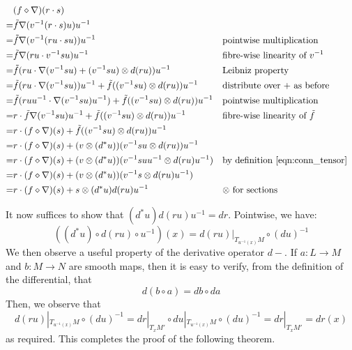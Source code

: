 \begin{align*}
   & (f \diamond \nabla)(r \cdot s) \\
  =& \tilde{f}\nabla(v^{-1}(r \cdot s)u)u^{-1} \\
  =& \tilde{f}\nabla(v^{-1}(ru \cdot su))u^{-1}
    && \text{pointwise multiplication} \\
  =& \tilde{f}\nabla(ru \cdot v^{-1}su)u^{-1}
    && \text{fibre-wise linearity of } v^{-1} \\
  =& \tilde{f}(ru \cdot \nabla(v^{-1}su) + (v^{-1}su) \otimes d(ru))u^{-1}
    && \text{Leibniz property} \\
  =& \tilde{f}(ru \cdot \nabla(v^{-1}su))u^{-1}
      + \tilde{f}((v^{-1}su) \otimes d(ru))u^{-1}
    && \text{distribute over $+$ as before} \\
  =& \tilde{f}(ruu^{-1} \cdot \nabla(v^{-1}su)u^{-1})
      + \tilde{f}((v^{-1}su) \otimes d(ru))u^{-1}
    && \text{pointwise multiplication} \\
  =& r \cdot \tilde{f}\nabla(v^{-1}su)u^{-1}
      + \tilde{f}((v^{-1}su) \otimes d(ru))u^{-1}
    && \text{fibre-wise linearity of } \tilde{f} \\
  =& r \cdot (f \diamond \nabla)(s)
      + \tilde{f}((v^{-1}su) \otimes d(ru))u^{-1} \\
  =& r \cdot (f \diamond \nabla)(s)
      + (v \otimes (d^*u))(v^{-1}su \otimes d(ru))u^{-1} \\
  =& r \cdot (f \diamond \nabla)(s)
      + (v \otimes (d^*u))(v^{-1}suu^{-1} \otimes d(ru)u^{-1})
    && \text{by definition \eqref{eqn:conn_tensor}} \\
  =& r \cdot (f \diamond \nabla)(s)
      + (v \otimes (d^*u))(v^{-1}s \otimes d(ru)u^{-1}) \\
  =& r \cdot (f \diamond \nabla)(s)
      + s \otimes (d^*u)d(ru)u^{-1}
    && \text{$\otimes$ for sections}
\end{align*}

It now suffices to show that $(d^*u)d(ru)u^{-1} = dr$. Pointwise, we have:
\[
  ((d^*u) \circ d(ru) \circ u^{-1})(x) = d(ru)|_{T_{u^{-1}(x)}M} \circ (du)^{-1}
\]
We then observe a useful property of the derivative
operator $d-$. If $a : L \to M$ and $b : M \to N$ are smooth maps, then it is
easy to verify, from the definition of the differential, that
\[
  d(b \circ a) = db \circ da
\]
Then, we observe that
\[
  d(ru)|_{T_{u^{-1}(x)}M} \circ (du)^{-1}
  = dr|_{T_xM'} \circ du|_{T_{u^{-1}(x)}M} \circ (du)^{-1}
  = dr|_{T_xM'}
  = dr(x)
\]
as required. This completes the proof of the following theorem.


